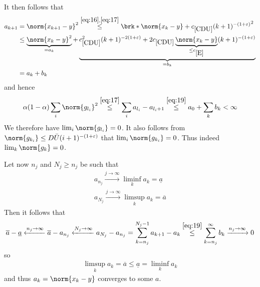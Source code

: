 \begin{frame}
	\begin{proofs}
	It then follows that
	\begin{equation}
	\begin{aligned}
		a_{k+1} &= \norm{x_{k+1}-y}^2\stackrel{\eqref{eq:16}, \eqref{eq:17}}{\leq}\brk*{\norm{x_k-y}+\useconstant{CDU}(k+1)^{-(1+\e)}}^2 \\
		&\leq \underbrace{\norm{x_k-y}^2}_{=a_k}+\underbrace{\useconstant{CDU}^2(k+1)^{-2(1+\e)}+2\useconstant{CDU}\underbrace{\norm{x_k-y}}_{\leq \useconstant{E}}(k+1)^{-(1+\e)}}_{=b_k} \\
		&= a_k+b_k
	\end{aligned}
	\label{eq:19}
	\end{equation}
	and hence
	\begin{align*}
		\alpha(1-\alpha)\sum_i\norm{g_{l_i}}^2
		\stackrel{\eqref{eq:17}}{\leq} \sum_i a_{l_i}-a_{l_i+1}
		\stackrel{\eqref{eq:19}}{\leq}a_0+\sum_k b_k
		<\infty
	\end{align*}
	We therefore have $\lim_i\norm{g_{l_i}}=0$. It also follows from $\norm{g_{k_i}}\leq D\barU (i+1)^{-(1+\e)}$ that $\lim_i\norm{g_{k_i}}=0$. Thus indeed $\lim_k\norm{g_k}=0$.
	\end{proofs}
\end{frame}


\begin{frame}
	\begin{proofs}
	Let now $n_j$ and  $N_j\geq n_j$ be such that
	\begin{align*}
		a_{n_j}\xrightarrow{j\to\infty}\liminf_ka_k=\underline{a} \\
		a_{N_j}\xrightarrow{j\to\infty}\limsup_ka_k=\overline{a}	
	\end{align*}
	Then it follows that
	\begin{align*}
		\overline{a}-\underline{a}
		\xleftarrow{n_j\to\infty}\overline{a}-a_{n_j}
		\xleftarrow{N_j\to\infty}a_{N_j}-a_{n_j}
		= \sum_{k=n_j}^{N_j-1}a_{k+1}-a_k
		\stackrel{\eqref{eq:19}}{\leq} \sum_{k=n_j}^\infty b_k
		\xrightarrow{n_j\to\infty}0
	\end{align*}
	so
	\begin{align*}
		\limsup_ka_k=\overline{a}\leq \underline{a}=\liminf_ka_k
	\end{align*}
	and thus $a_k=\norm{x_k-y}$ converges to some $a$.
	\end{proofs}
\end{frame}


